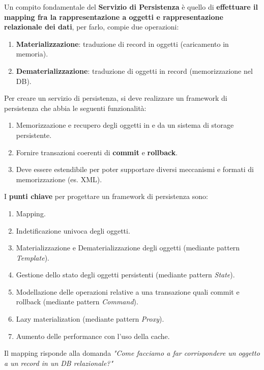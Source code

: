 {    
    Un compito fondamentale del \textbf{Servizio di Persistenza} è quello di \textbf{effettuare il mapping fra
        la rappresentazione a oggetti e rappresentazione relazionale dei dati}, per farlo, compie due operazioni:
    \begin{enumerate}
        \item \textbf{Materializzazione}: traduzione di record in oggetti (caricamento in memoria).
        \item \textbf{Dematerializzazione}: traduzione di oggetti in record (memorizzazione nel DB).
    \end{enumerate}

    Per creare un servizio di persistenza, si deve realizzare un framework di persistenza che abbia le seguenti funzionalità:
    \begin{enumerate}
        \item Memorizzazione e recupero degli oggetti in e da un sistema di storage persistente.
        \item Fornire transazioni coerenti di \textbf{commit} e \textbf{rollback}.
        \item Deve essere estendibile per poter supportare diversi meccanismi e formati di memorizzazione (es. XML).
    \end{enumerate}

    I \textbf{punti chiave} per progettare un framework di persistenza sono:
    \begin{enumerate}
        \item Mapping.
        \item Indetificazione univoca degli oggetti.
        \item Materializzazione e Dematerializzazione degli oggetti (mediante pattern \textit{Template}).
        \item Gestione dello stato degli oggetti persistenti (mediante pattern \textit{State}).
        \item Modellazione delle operazioni relative a una transazione quali commit e rollback (mediante pattern \textit{Command}).
        \item Lazy materialization (mediante pattern \textit{Proxy}).
        \item Aumento delle performance con l'uso della cache.
    \end{enumerate}

    \newpage
    Il mapping risponde alla domanda \textit{"Come facciamo a far corrispondere un oggetto a un record in un DB relazionale?"}

}
